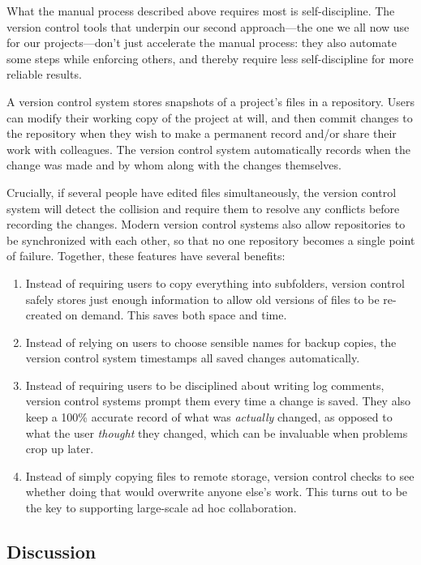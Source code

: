 \documentclass[10pt]{article}
\begin{document}
What the manual process described above requires most is
self-discipline. The version control tools that underpin our second
approach---the one we all now use for our projects---don't just
accelerate the manual process: they also automate some steps while
enforcing others, and thereby require less self-discipline for more
reliable results.

A version control system stores snapshots of a project's files in a
repository. Users can modify their working copy of the project at will,
and then commit changes to the repository when they wish to make a
permanent record and/or share their work with colleagues. The version
control system automatically records when the change was made and by
whom along with the changes themselves.

Crucially, if several people have edited files simultaneously, the
version control system will detect the collision and require them to
resolve any conflicts before recording the changes. Modern version
control systems also allow repositories to be synchronized with each
other, so that no one repository becomes a single point of failure.
Together, these features have several benefits:

\begin{enumerate}
\item
  Instead of requiring users to copy everything into subfolders, version
  control safely stores just enough information to allow old versions of
  files to be re-created on demand. This saves both space and time.
\item
  Instead of relying on users to choose sensible names for backup
  copies, the version control system timestamps all saved changes
  automatically.
\item
  Instead of requiring users to be disciplined about writing log
  comments, version control systems prompt them every time a change is
  saved. They also keep a 100\% accurate record of what was
  \emph{actually} changed, as opposed to what the user \emph{thought}
  they changed, which can be invaluable when problems crop up later.
\item
  Instead of simply copying files to remote storage, version control
  checks to see whether doing that would overwrite anyone else's work.
  This turns out to be the key to supporting large-scale ad hoc
  collaboration.
\end{enumerate}

\subsection*{Discussion}
\end{document}
